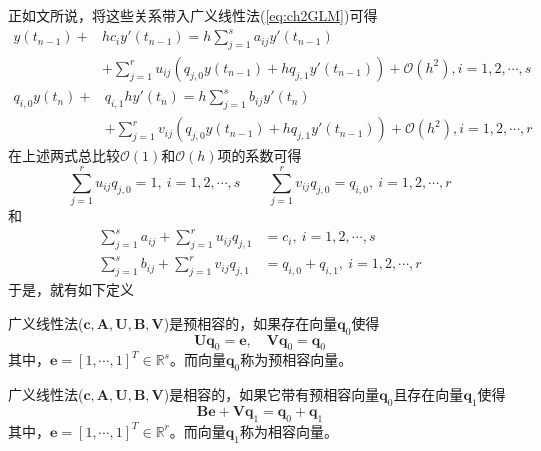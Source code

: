 正如文所说，将这些关系带入广义线性法(\ref{eq:ch2GLM})可得
\begin{equation}
\begin{aligned}
y(t_{n-1})+&hc_iy'(t_{n-1})=h\sum_{j=1}^{s}a_{ij}y'(t_{n-1})\\
&+\sum_{j=1}^{r}u_{ij}\left(q_{j,0}y(t_{n-1})+hq_{j,1}y'(t_{n-1})\right)+\mathcal{O}(h^2),i=1,2,\cdots,s
\end{aligned}
\end{equation}\vspace{-0.5cm}
\begin{equation}
\begin{aligned}
q_{i,0}y(t_{n})+&q_{i,1}hy'(t_{n})=h\sum_{j=1}^{s}b_{ij}y'(t_{n})\\
&+\sum_{j=1}^{r}v_{ij}\left(q_{j,0}y(t_{n-1})+hq_{j,1}y'(t_{n-1})\right)+\mathcal{O}(h^2),i=1,2,\cdots,r
\end{aligned}
\end{equation}
在上述两式总比较$\mathcal{O}(1)$和$\mathcal{O}(h)$项的系数可得
\begin{equation}
\sum_{j=1}^{r}u_{ij}q_{j,0}=1,\ i=1,2,\cdots,s\qquad \sum_{j=1}^{r}v_{ij}q_{j,0}=q_{i,0},\ i = 1,2,\cdots,r
\end{equation}
和
\begin{subequations}
\begin{align}
\sum_{j=1}^{s}a_{ij}+\sum_{j=1}^{r}u_{ij}q_{j,1}&=c_i,\ i=1,2,\cdots,s\\
\sum_{j=1}^{s}b_{ij}+\sum_{j=1}^{r}v_{ij}q_{j,1}&=q_{i,0}+q_{i,1},\ i=1,2,\cdots,r
\end{align}
\end{subequations}
于是，就有如下定义%
\begin{definition}[预相容]
广义线性法($\bm{c},\bm{A},\bm{U},\bm{B},\bm{V}$)是预相容的\cite{Jackiewicz2009,Burrage1995,Butcher2008}，如果存在向量$\bm{q}_0$使得
\begin{equation}
\bm{Uq}_0=\bm{e},\quad \bm{Vq}_0=\bm{q}_0\label{eq:ch2PreConsistent}
\end{equation}
其中，$\bm{e}=[1,\cdots,1]^T\in\mathbb{R}^s$。而向量$\bm{q}_0$称为预相容向量。
\end{definition}%
\begin{definition}[相容]
广义线性法($\bm{c},\bm{A},\bm{U},\bm{B},\bm{V}$)是相容的\cite{Jackiewicz2009,Burrage1995,Butcher2008}，如果它带有预相容向量$\bm{q}_0$且存在向量$\bm{q}_1$使得
\begin{equation}
\bm{Be}+\bm{Vq}_1=\bm{q}_0+\bm{q}_1\label{eq:ch2Consistent}
\end{equation}
其中，$\bm{e}=[1,\cdots,1]^T\in\mathbb{R}^r$。而向量$\bm{q}_1$称为相容向量。
\end{definition}%
